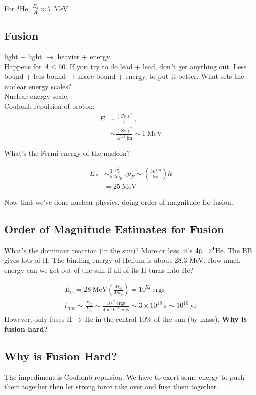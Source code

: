 For $^4$He, $\frac{E_b}{A} \approx 7$ MeV. 

\subsection{Fusion}
light + light $\rightarrow$ heavier + energy\\
Happens for $A \leq 60$. If you try to do lead + lead, don't get anything out. Less bound + less bound $\rightarrow$ more bound + energy, to put it better. What sets the nuclear energy scales? \\

Nuclear energy scale:\\
Coulomb repulsion of proton:\\
\begin{align}
E & \sim \frac{(Ze)^2}{r}~,\\
& \sim \frac{(Ze)^2}{A^{1/3} ~ \text{fm}} \sim 1 ~ \text{MeV}
\end{align}

What's the Fermi energy of the nucleon?

\begin{align}
E_F & \sim \frac{3}{5} \frac{p_F^2}{2 m_p}~, p_F \sim \left( \frac{3 n^{1/3}}{8 \pi} \right) h\\
& = 25 ~\text{MeV}
\end{align}

Now that we've done nuclear physics, doing order of magnitude for fusion.

\subsection{Order of Magnitude Estimates for Fusion}

What's the dominant reaction (in the sun)? More or less, it's $4 \text{p} \rightarrow ^4$He. The BB gives lots of H. The binding energy of Helium is about 28.3 MeV. How much energy can we get out of the sun if all of its H turns into He? 

\begin{align}
E_\odot = 28~\text{MeV} \left( \frac{M_\odot}{4m_p} \right) = 10^{52} ~\text{ergs}\\
t_{nuc} \sim \frac{E_\odot}{L_\odot} \sim \frac{10^{52}~\text{ergs}}{4 \times 10^{33} ~\text{ergs}} \sim 3 \times 10^{18} ~ \text{s} \sim 10^{10} ~ \text{yr}
\end{align}
However,  only fuses H $\rightarrow$ He in the central 10\% of the sun (by mass). \textbf{Why is fusion hard?}

\subsection{Why is Fusion Hard?}
The impediment is Coulomb repulsion. We have to exert some energy to push them together then let strong force take over and fuse them together. \\


